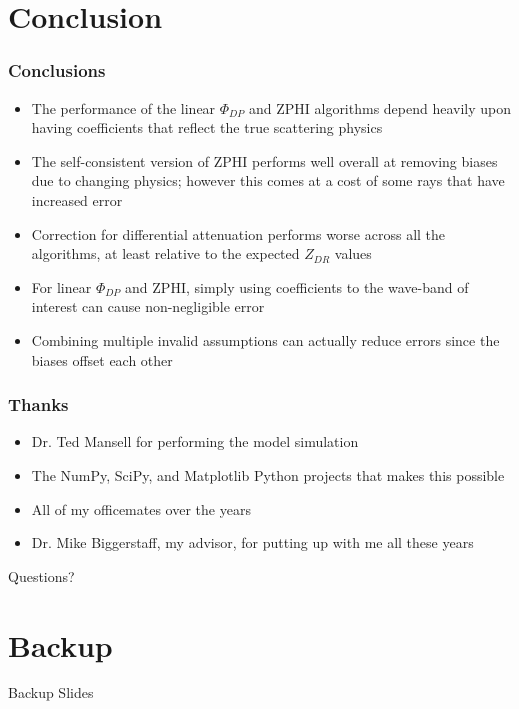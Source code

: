 \documentclass[red]{beamer}
\begin{document}
\section{Conclusion}
\begin{frame}[<+->]
	\frametitle{Conclusions}
	\begin{itemize}
		\item The performance of the linear $\Phi_{DP}$ and ZPHI algorithms depend heavily upon having coefficients
		that reflect the true scattering physics
		\item The self-consistent version of ZPHI performs well overall at removing biases due to changing physics; however this comes
		at a cost of some rays that have increased error
		\item Correction for differential attenuation performs worse across all the algorithms, at least relative to the expected $Z_{DR}$ values
		\item For linear $\Phi_{DP}$ and ZPHI, simply using coefficients to the wave-band of interest can cause non-negligible error
		\item Combining multiple invalid assumptions can actually reduce errors since the biases offset each other
	\end{itemize}
\end{frame}

\begin{frame}
	\frametitle{Thanks}
	\begin{itemize}
		\item Dr. Ted Mansell for performing the model simulation
		\item The NumPy, SciPy, and Matplotlib Python projects that makes this possible
		\item All of my officemates over the years
		\item Dr. Mike Biggerstaff, my advisor, for putting up with me all these years
	\end{itemize}
	\begin{center}
		\large{Questions?}
	\end{center}
\end{frame}

\section{Backup}
\begin{frame}
	\begin{center}
		Backup Slides
	\end{center}
\end{frame}
\end{document}
